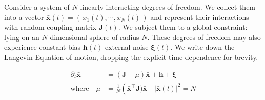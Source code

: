 Consider a system of $N$ linearly interacting degrees of freedom. We collect them into a vector $\mathbf{\bar x}(t) = \left(\,x_1(t),\cdots, x_N(t)\,\right)$ and represent their interactions with random coupling matrix $\mathbf{J}(t)$. We subject them to a global constraint: lying on an $N$-dimensional sphere of radius $N$. These degrees of freedom may also experience constant bias $\mathbf{h}(t)$ external noise $\boldsymbol\xi(t)$. We write down the Langevin Equation of motion, dropping the explicit time dependence for brevity.

\begin{align}
\partial_t\mathbf{\bar x} &= (\mathbf{J}-\mu)\mathbf{\bar x}+\mathbf{h}+\boldsymbol\xi \\
\mathrm{where}\quad\mu &= \frac{1}{N}\left(\mathbf{\bar x}^{\top}\mathbf{J})\mathbf{\bar x}\quad|\mathbf{\bar x}(t)|^2=N
\end{align}